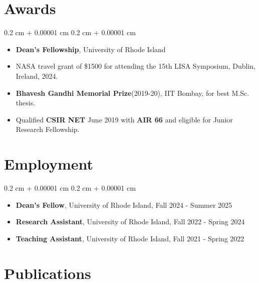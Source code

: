 \documentclass[10pt, letterpaper]{article}
\newenvironment{highlightsforbulletentries}{
    \begin{itemize}[
        topsep=0.10 cm,
        parsep=0.10 cm,
        partopsep=0pt,
        itemsep=0pt,
        leftmargin=10pt
    ]
}{
    \end{itemize}
}
\newenvironment{onecolentry}{
    \begin{adjustwidth}{
        0.2 cm + 0.00001 cm
    }{
        0.2 cm + 0.00001 cm
    }
}{
    \end{adjustwidth}
}
\begin{document}
\section{Awards} 
\begin{onecolentry}
  \begin{highlightsforbulletentries}
    \item \textbf{Dean's Fellowship}, University of Rhode Island

    \item NASA travel grant of \$1500 for attending the 15th LISA Symposium, Dublin, Ireland, 2024.

    \item \textbf{Bhavesh Gandhi Memorial Prize}(2019-20), IIT Bombay, for best M.Sc. thesis.

    \item Qualified \textbf{CSIR NET} June 2019 with \textbf{AIR 66} and eligible for Junior Research Fellowship.
  \end{highlightsforbulletentries}
\end{onecolentry}


\section{Employment} 
\begin{onecolentry}
  \begin{highlightsforbulletentries}
    \item \textbf{Dean's Fellow}, University of Rhode Island, Fall 2024 - Summer 2025
    \item \textbf{Research Assistant}, University of Rhode Island, Fall 2022 - Spring 2024
    \item \textbf{Teaching Assistant}, University of Rhode Island, Fall 2021 - Spring 2022
  \end{highlightsforbulletentries}
\end{onecolentry}


\section{Publications}
\end{document}
